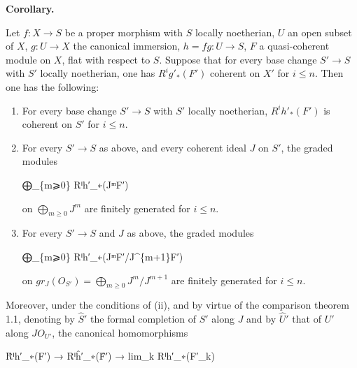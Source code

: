 \documentclass[
]{article}
\newenvironment{Shaded}{}{}
\newcommand{\NormalTok}[1]{#1}
\begin{document}
\textbf{Corollary.}

Let \(f: X \to S\) be a proper morphism with \(S\) locally noetherian,
\(U\) an open subset of \(X\), \(g: U \to X\) the canonical immersion,
\(h = fg: U \to S\), \(F\) a quasi-coherent module on \(X\), flat with
respect to \(S\). Suppose that for every base change \(S' \to S\) with
\(S'\) locally noetherian, one has \(R^{i}g'_{\ast}(F')\) coherent on
\(X'\) for \(i \leqslant n\). Then one has the following:

\begin{enumerate}
\def\labelenumi{\arabic{enumi}.}
\item
  For every base change \(S' \to S\) with \(S'\) locally noetherian,
  \(R^{i}h'_{\ast}(F')\) is coherent on \(S'\) for \(i \leqslant n\).
\item
  For every \(S' \to S\) as above, and every coherent ideal \(J\) on
  \(S'\), the graded modules

\begin{Shaded}
\begin{Highlighting}[]
\NormalTok{⨁\_\{m⩾0\} Rⁱh′\_∗(JᵐF′)}
\end{Highlighting}
\end{Shaded}

  on \(\bigoplus_{m\geqslant 0} J^{m}\) are finitely generated for
  \(i \leqslant n\).
\item
  For every \(S' \to S\) and \(J\) as above, the graded modules

\begin{Shaded}
\begin{Highlighting}[]
\NormalTok{⨁\_\{m⩾0\} Rⁱh′\_∗(JᵐF′/J\^{}\{m+1\}F′)}
\end{Highlighting}
\end{Shaded}

  on \(gr_{J}(O_{S'}) = \bigoplus_{m\geqslant 0} J^{m}/J^{m+1}\) are
  finitely generated for \(i \leqslant n\).
\end{enumerate}

Moreover, under the conditions of (ii), and by virtue of the comparison
theorem 1.1, denoting by \(\hat{S}'\) the formal completion of \(S'\)
along \(J\) and by \(\hat{U}'\) that of \(U'\) along \(J O_{U'}\), the
canonical homomorphisms

\begin{Shaded}
\begin{Highlighting}[]
\NormalTok{R̂ⁱh′\_∗(F′) → Rⁱĥ′\_∗(F̂′) → lim\_k Rⁱh′\_∗(F′\_k)}
\end{Highlighting}
\end{Shaded}
\end{document}
